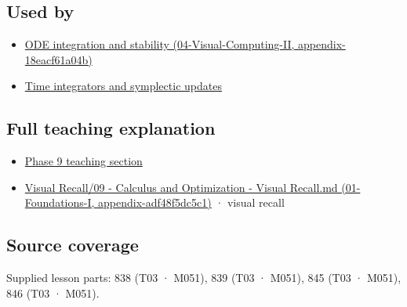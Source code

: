 \subsection{Used by}\label{used-by}

\begin{itemize}
\tightlist
\item
  \href{}{ODE integration and stability (04-Visual-Computing-II, appendix-18eacf61a04b)}
\item
  \hyperref[appendix-8f96f9c4d5bc]{Time integrators and symplectic updates}
\end{itemize}

\subsection{Full teaching explanation}\label{full-teaching-explanation}

\begin{itemize}
\tightlist
\item
  \href{Continuous\%20Notes/Computing\%20Foundations\%20-\%20From\%20Bits\%20to\%20C++\%20and\%20Systems\%20APIs\#ODEs\%20and\%20numerical\%20simulation}{Phase 9 teaching section}
\item
  \href{}{Visual Recall/09 - Calculus and Optimization - Visual Recall.md (01-Foundations-I, appendix-adf48f5dc5c1)} · visual recall
\end{itemize}

\subsection{Source coverage}\label{source-coverage}

Supplied lesson parts: 838 (T03 · M051), 839 (T03 · M051), 845 (T03 · M051), 846 (T03 · M051).
